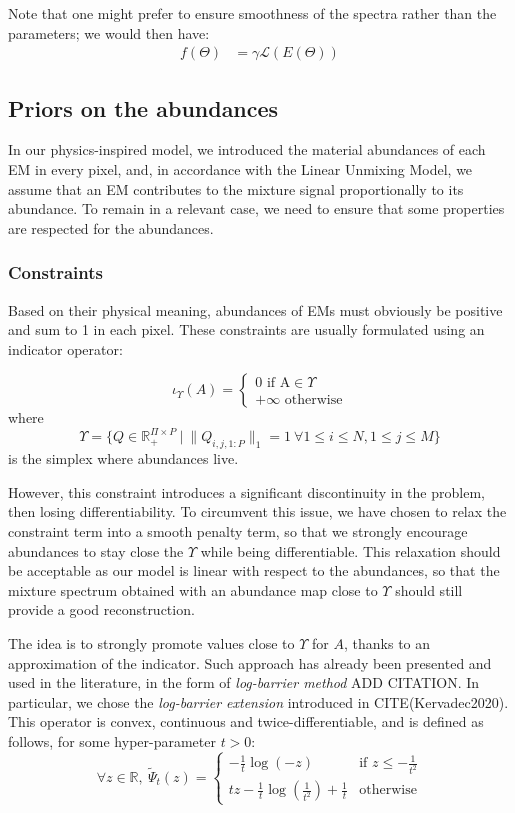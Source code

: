 \documentclass{article}
\begin{document}
Note that one might prefer to ensure smoothness of the spectra rather than the parameters; we would then have:
\begin{align*}
  f(\Theta) &= \gamma \mathcal{L}(E(\Theta))
\end{align*}

\subsection{Priors on the abundances}
In our physics-inspired model, we introduced the material abundances of each EM in every pixel, and, in accordance with the Linear Unmixing Model, we assume that an EM contributes to the mixture signal proportionally to its abundance. To remain in a relevant case, we need to ensure that some properties are respected for the abundances.

\subsubsection{Constraints}

Based on their physical meaning, abundances of EMs must obviously be positive and sum to 1 in each pixel. These constraints are usually formulated using an indicator operator:

$$\iota_\Upsilon (A) = \begin{cases} 0 \text{ if A}\in \Upsilon\\ +\infty \text{ otherwise} \end{cases}$$
where
$$\Upsilon = \{Q \in \mathbb{R}^{\Pi \times P}_+\ |\ \| Q_{i, j, 1:P} \|_1 = 1 \ \forall 1 \leq i \leq N, 1 \leq j \leq M\}$$
is the simplex where abundances live.

However, this constraint introduces a significant discontinuity in the problem, then losing differentiability. To circumvent this issue, we have chosen to relax the constraint term into a smooth penalty term, so that we strongly encourage abundances to stay close the $\Upsilon$ while being differentiable. This relaxation should be acceptable as our model is linear with respect to the abundances, so that the mixture spectrum obtained with an abundance map close to $\Upsilon$ should still provide a good reconstruction.

The idea is to strongly promote values close to $\Upsilon$ for $A$, thanks to an approximation of the indicator. Such approach has already been presented and used in the literature, in the form of \emph{log-barrier method} ADD CITATION. In particular, we chose the \emph{log-barrier extension} introduced in CITE(Kervadec2020). This operator is convex, continuous and twice-differentiable, and is defined as follows, for some hyper-parameter $t > 0$:
$$\forall z\in \mathbb{R},\ \tilde\Psi_t (z) = \begin{cases} - \frac{1}{t} \log (-z) & \text{if } z \leq -\frac{1}{t^2}\\ tz - \frac{1}{t} \log(\frac{1}{t^2}) + \frac{1}{t} & \text{otherwise} \end{cases}$$
\end{document}

